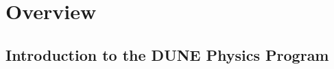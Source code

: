 \chapter{Overview}
\label{ch:physics-overview}



\section{Introduction to the DUNE Physics Program}
\label{sec:intro-lbnfdune-phys}

